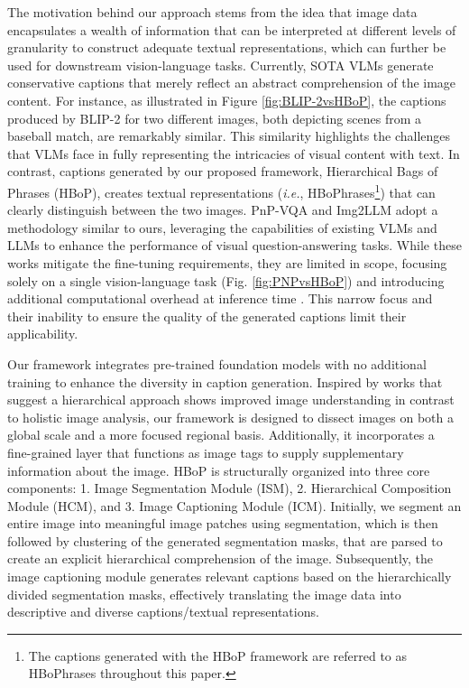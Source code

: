 The motivation behind our approach stems from the idea that image data encapsulates a wealth of information that can be interpreted at different levels of granularity to construct adequate textual representations, which can further be used for downstream vision-language tasks. Currently, SOTA VLMs generate conservative captions that merely reflect an abstract comprehension of the image content. For instance, as illustrated in Figure \ref{fig:BLIP-2vsHBoP}, the captions produced by BLIP-2 \cite{li2023blip} for two different images, both depicting scenes from a baseball match, are remarkably similar. This similarity highlights the challenges that VLMs face in fully representing the intricacies of visual content with text. In contrast, captions generated by our proposed framework, Hierarchical Bags of Phrases (HBoP), creates textual representations (\textit{i.e.}, HBoPhrases\footnote{The captions generated with the HBoP framework are referred to as HBoPhrases throughout this paper.}) that can clearly distinguish between the two images. PnP-VQA \cite{tiong2022plug} and Img2LLM \cite{guo2023images} adopt a methodology similar to ours, leveraging the capabilities of existing VLMs and LLMs to enhance the performance of visual question-answering tasks. While these works mitigate the fine-tuning requirements, they are limited in scope, focusing solely on a single vision-language task (Fig. \ref{fig:PNPvsHBoP}) and introducing additional computational overhead at inference time \cite{tiong2022plug}. This narrow focus and their inability to ensure the quality of the generated captions limit their applicability.  




Our framework integrates pre-trained foundation models with no additional training to enhance the diversity in caption generation. Inspired by works \cite{ji2021step,Shao2023ICCV,shukor2022efficient} that suggest a hierarchical approach shows improved image understanding in contrast to holistic image analysis, our framework is designed to dissect images on both a global scale and a more focused regional basis. Additionally, it incorporates a fine-grained layer that functions as image tags to supply supplementary information about the image. HBoP is structurally organized into three core components: 1. Image Segmentation Module (ISM), 2. Hierarchical Composition Module (HCM), and 3. Image Captioning Module (ICM). Initially, we segment an entire image into meaningful image patches using segmentation, which is then followed by clustering of the generated segmentation masks, that are parsed to create an explicit hierarchical comprehension of the image. Subsequently, the image captioning module generates relevant captions based on the hierarchically divided segmentation masks, effectively translating the image data into descriptive and diverse captions/textual representations.
 

